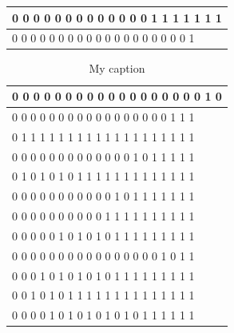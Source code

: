 \documentclass[11pt, a4paper]{article}
\begin{document}
\begin{enumerate}
\begin{table}[http]
\begin{tabular}{|l|}
			0     0     0     0     0     0     0     0     0     0     0     0     0     1     1     1     1     1     1     1 \\ \hline
			0     0     0     0     0     0     0     0     0     0     0     0     0     0     0     0     0     0     0     1 \\ \hline
			\end{tabular}
		\end{table}
		\begin{table}[http]
			\centering
			\caption{My caption}
			\label{my-label}
			\begin{tabular}{|l|}
				\hline
			0     0     0     0     0     0     0     0     0     0     0     0     0     0     0     0     0     0     1     0 \\ \hline
			0     0     0     0     0     0     0     0     0     0     0     0     0     0     0     0     0     1     1     1 \\ \hline
			0     1     1     1     1     1     1     1     1     1     1     1     1     1     1     1     1     1     1     1 \\ \hline
			0     0     0     0     0     0     0     0     0     0     0     0     0     1     0     1     1     1     1     1 \\ \hline
			0     1     0     1     0     1     0     1     1     1     1     1     1     1     1     1     1     1     1     1 \\ \hline
			0     0     0     0     0     0     0     0     0     0     0     1     0     1     1     1     1     1     1     1 \\ \hline
			0     0     0     0     0     0     0     0     0     0     1     1     1     1     1     1     1     1     1     1 \\ \hline
			0     0     0     0     0     1     0     1     0     1     0     1     1     1     1     1     1     1     1     1 \\ \hline
			0     0     0     0     0     0     0     0     0     0     0     0     0     0     0     0     1     0     1     1 \\ \hline
			0     0     0     1     0     1     0     1     0     1     0     1     1     1     1     1     1     1     1     1 \\ \hline
			0     0     1     0     1     0     1     1     1     1     1     1     1     1     1     1     1     1     1     1 \\ \hline
			0     0     0     0     1     0     1     0     1     0     1     0     1     0     1     1     1     1     1     1 \\ \hline

\end{tabular}
\end{table}
\end{enumerate}
\end{document}
